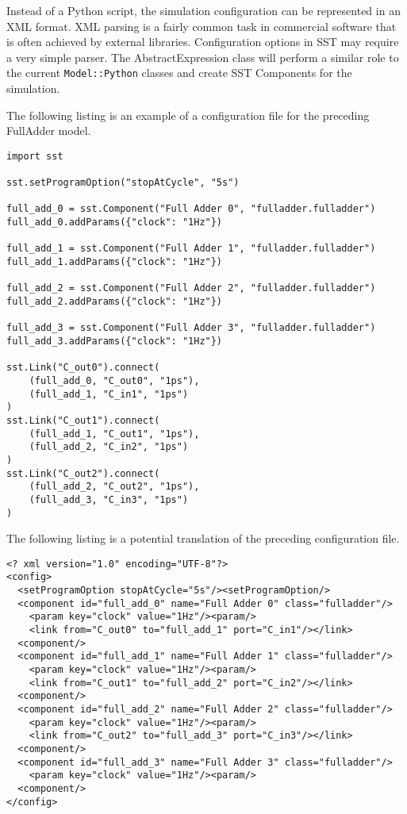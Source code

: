 Instead of a Python script, the simulation configuration can be represented in an XML format. XML parsing is a fairly common task in commercial software that is often achieved by external libraries. Configuration options in SST may require a very simple parser. The AbstractExpression class will perform a similar role to the current \texttt{Model::Python} classes and create SST Components for the simulation.

The following listing is an example of a configuration file for the preceding FullAdder model.
\begin{lstlisting}[style=customPython,label=runPy,caption=Example SST Configuration File \\ File: run.py]
import sst

sst.setProgramOption("stopAtCycle", "5s")

full_add_0 = sst.Component("Full Adder 0", "fulladder.fulladder")
full_add_0.addParams({"clock": "1Hz"})

full_add_1 = sst.Component("Full Adder 1", "fulladder.fulladder")
full_add_1.addParams({"clock": "1Hz"})

full_add_2 = sst.Component("Full Adder 2", "fulladder.fulladder")
full_add_2.addParams({"clock": "1Hz"})

full_add_3 = sst.Component("Full Adder 3", "fulladder.fulladder")
full_add_3.addParams({"clock": "1Hz"})

sst.Link("C_out0").connect(
    (full_add_0, "C_out0", "1ps"),
    (full_add_1, "C_in1", "1ps")
)
sst.Link("C_out1").connect(
    (full_add_1, "C_out1", "1ps"),
    (full_add_2, "C_in2", "1ps")
)
sst.Link("C_out2").connect(
    (full_add_2, "C_out2", "1ps"),
    (full_add_3, "C_in3", "1ps")
)
\end{lstlisting}

The following listing is a potential translation of the preceding configuration file.
\begin{lstlisting}[style=customXML,label=xml,caption=Potential Implementation of an SST Configuration File \\ File: run.xml]
<? xml version="1.0" encoding="UTF-8"?>
<config>
  <setProgramOption stopAtCycle="5s"/><setProgramOption/>
  <component id="full_add_0" name="Full Adder 0" class="fulladder"/>
    <param key="clock" value="1Hz"/><param/>
    <link from="C_out0" to="full_add_1" port="C_in1"/></link>
  <component/>
  <component id="full_add_1" name="Full Adder 1" class="fulladder"/>
    <param key="clock" value="1Hz"/><param/>
    <link from="C_out1" to="full_add_2" port="C_in2"/></link>
  <component/>
  <component id="full_add_2" name="Full Adder 2" class="fulladder"/>
    <param key="clock" value="1Hz"/><param/>
    <link from="C_out2" to="full_add_3" port="C_in3"/></link>
  <component/>
  <component id="full_add_3" name="Full Adder 3" class="fulladder"/>
    <param key="clock" value="1Hz"/><param/>
  <component/>
</config>
\end{lstlisting}

